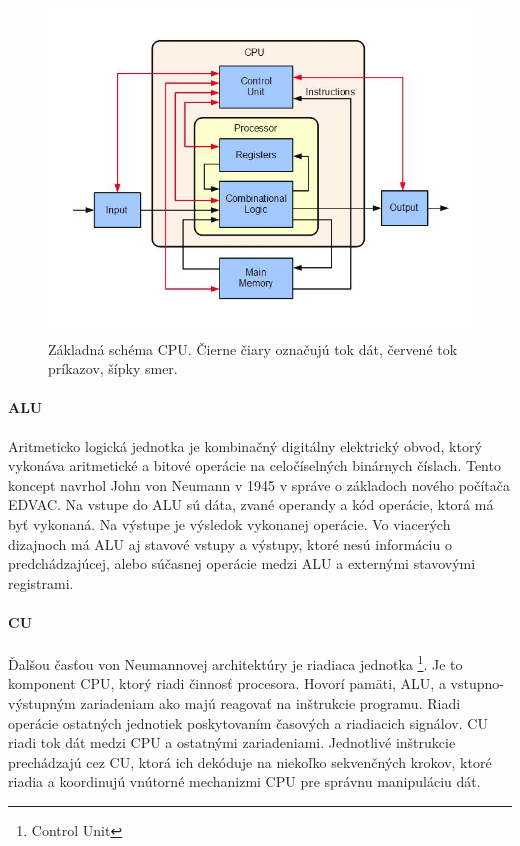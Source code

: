 \documentclass[11pt,a4paper]{report}
\begin{document}
\begin{figure}[ht]
        \centering
        \includegraphics[scale=0.4]{images/ABasicComputer}
        \caption{Základná schéma CPU. Čierne čiary označujú tok dát, červené tok príkazov, šípky smer.}
        \label{CPU:}
\end{figure}
\newpage


\paragraph{ALU} Aritmeticko logická jednotka je kombinačný digitálny elektrický obvod, ktorý vykonáva aritmetické a bitové operácie na celočíselných binárnych číslach. Tento koncept navrhol John von Neumann v 1945 v správe o základoch nového počítača EDVAC. Na vstupe do ALU sú dáta, zvané operandy a kód operácie, ktorá má byť vykonaná. Na výstupe je výsledok vykonanej operácie. Vo viacerých dizajnoch má ALU aj stavové vstupy a výstupy, ktoré nesú informáciu o predchádzajúcej, alebo súčasnej operácie medzi ALU a externými stavovými registrami. 

\paragraph{CU} Ďalšou časťou von Neumannovej architektúry je riadiaca jednotka \footnote{Control Unit}. Je to komponent CPU, ktorý riadi činnosť procesora. Hovorí pamäti, ALU, a vstupno-výstupným zariadeniam ako majú reagovať na inštrukcie programu. Riadi operácie ostatných jednotiek poskytovaním časových a riadiacich signálov. CU riadi tok dát medzi CPU a ostatnými zariadeniami. Jednotlivé inštrukcie prechádzajú cez CU, ktorá ich dekóduje na niekoľko sekvenčných krokov, ktoré riadia a koordinujú vnútorné mechanizmi CPU pre správnu manipuláciu dát.
\end{document}
